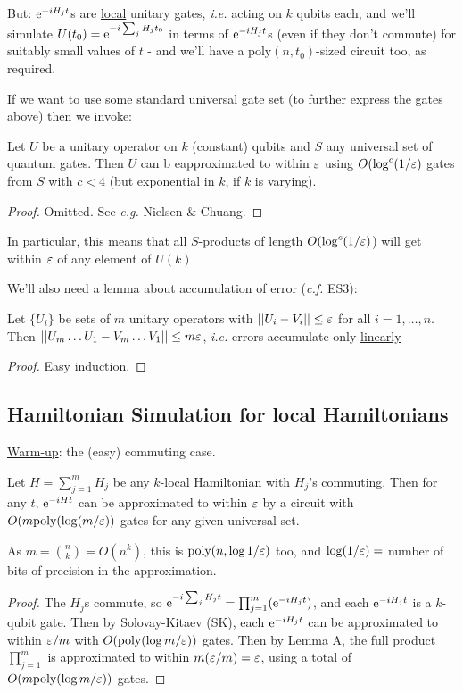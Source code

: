 \documentclass[]{article}
\renewcommand{\it}[1]{\textit{#1}}
\newcommand{\poly}{\textrm{poly}}
\begin{document}
But: $\mathrm{e}^{-iH_jt}$s are \underline{local} unitary gates, \it{i.e.} acting on $k$ qubits each, and we'll simulate $U(t_0) = \mathrm{e}^{-i\sum_jH_jt_0}$ in terms of $\mathrm{e}^{-iH_jt}$s (even if they don't commute) for suitably small values of $t$ - and we'll have a $\poly(n,t_0)$-sized circuit too, as required.

If we want to use some standard universal gate set (to further express the gates above) then we invoke:

\begin{theorem*}
	Let $U$ be a unitary operator on $k$ (constant) qubits and $S$ any universal set of quantum gates. Then $U$ can b eapproximated to within $\varepsilon$ using $O(\log^c(1/\varepsilon)$ gates from $S$ with $c < 4$ (but exponential in $k$, if $k$ is varying).
\end{theorem*}
\begin{proof}
	Omitted. See \it{e.g.} Nielsen \& Chuang.
\end{proof}

In particular, this means that all $S$-products of length $O(\log^c(1/\varepsilon)$) will get within $\varepsilon$ of any element of $U(k)$.

We'll also need a lemma about accumulation of error (\it{c.f.} ES3):

\begin{thmenv*}[Lemma A]
	Let $\{U_i\}$ be sets of $m$ unitary operators with $||U_i-V_i||\le \varepsilon$  for all $i = 1,\dots,n$. Then $||U_m\dots U_1-V_m\dots V_1|| \le m\varepsilon$, \it{i.e.} errors accumulate only \underline{linearly}
\end{thmenv*}
\begin{proof}
	Easy induction.
\end{proof}

\subsection{Hamiltonian Simulation for local Hamiltonians}

\underline{Warm-up}: the (easy) commuting case.


\begin{thmenv*}[Proposition]
Let $H = \sum_{j=1}^m H_j$ be any $k$-local Hamiltonian with $H_j$'s commuting. Then for any $t$, $\mathrm{e}^{-iHt}$ can be approximated to within $\varepsilon$ by a circuit with $O(m\poly(\log(m/\eps))$ gates for any given universal set.
\end{thmenv*}
\begin{remark*}[Note]
	As $m = \binom{n}{k} = O(n^k)$, this is $\poly(n,\log 1/\eps)$ too, and $\log(1/\varepsilon) = $ number of bits of precision in the approximation.
\end{remark*}
\begin{proof}
	The $H_j$s commute, so $\mathrm{e}^{-i\sum_j H_j t} = \prod_{j=1}^{m}(\mathrm{e}^{-iH_jt})$, and each $\mathrm{e}^{-iH_jt}$ is a $k$-qubit gate. Then by Solovay-Kitaev (SK), each $\mathrm{e}^{-iH_jt}$ can be approximated to within $\varepsilon/m$ with $O(\poly(\log m/\eps))$ gates. Then by Lemma A, the full product $\prod_{j=1}^{m}$ is approximated to within $m(\varepsilon/m) = \varepsilon$, using a total of $O(m\poly(\log m/\eps))$ gates.
\end{proof}
\end{document}
